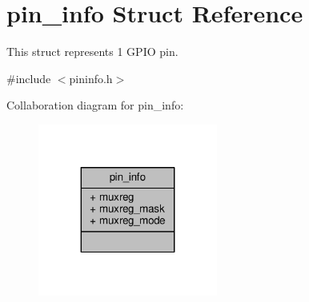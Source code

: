 \hypertarget{structpin__info}{}\section{pin\+\_\+info Struct Reference}
\label{structpin__info}


This struct represents 1 G\+P\+I\+O pin.  




{\ttfamily \#include $<$pininfo.\+h$>$}



Collaboration diagram for pin\+\_\+info\+:\nopagebreak
\begin{figure}[H]
\begin{center}
\leavevmode
\includegraphics[width=167pt]{structpin__info__coll__graph}
\end{center}
\end{figure}
